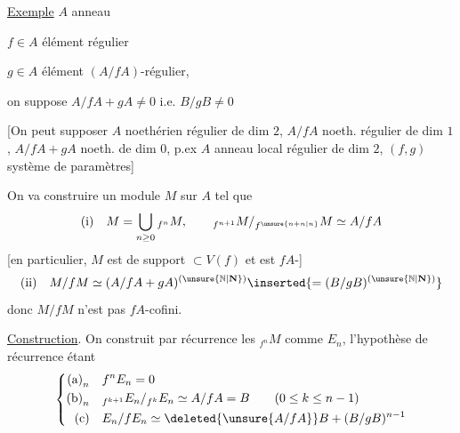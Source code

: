 \uline{Exemple} \quad $A$ anneau 

$f\in A$ élément régulier

$g\in A$ élément $(A/fA)$-régulier, \unsure{\&}

on suppose $A/fA+gA\ne0$ i.e. $B/gB\ne0$

[On peut supposer $A$ noethérien régulier de dim $2$,
$A/fA$ noeth. régulier de dim $1$,
$A/fA+gA$ noeth.  de dim $0$,
p.ex $A$ anneau local régulier de dim $2$,
$(f,g)$ système de paramètres]

On va construire un module $M$ sur $A$ tel que
\[
\text{(i)}\quad M=\bigcup_{n\geq0}{}_{f^n}M,\qquad
{}_{f^{n+1}}M/{}_{f^{\unsure{n+n|n}}}M\simeq A/fA
\]
[en particulier, $M$ est de support $\subset V(f)$ et est
$fA$-]
\[
\text{(ii)}\quad M/fM\simeq(A/fA+gA)^{(\unsure{\mathbb N|\mathbf N})}\inserted{=(B/gB)^{(\unsure{\mathbb N|\mathbf N})}}
\]
donc $M/fM$ n'est pas $fA$-cofini.

\uline{Construction}. On construit par récurrence les
${}_{f^n}M$ comme $E_n$, l'hypothèse de
récurrence étant
\[
\left\{\begin{aligned}
\text{(a)}_n\quad & f^nE_n=0\\
\text{(b)}_n\quad & {}_{f^{k+1}}E_n/{}_{f^k}E_n\simeq A/fA=B\qquad(0\leq k\leq n-1)\\
\text{(c)}\quad & E_n/fE_n\simeq\deleted{\unsure{A/fA}}B+(B/gB)^{n-1}
\end{aligned}\right.
\]

